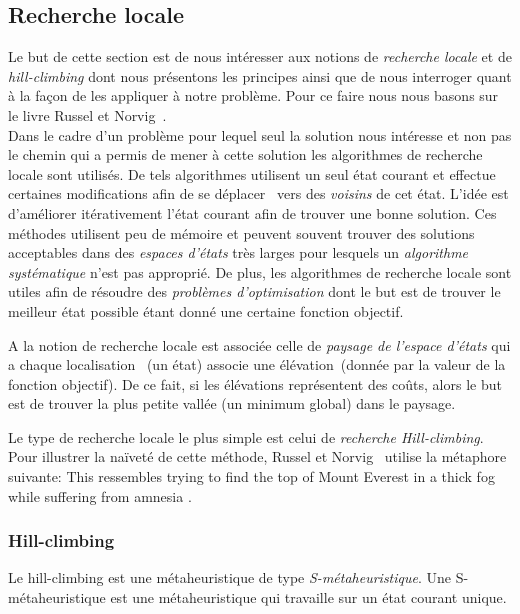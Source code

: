 
\subsection{Recherche locale}

Le but de cette section est de nous intéresser aux notions de \emph{recherche locale} et de \emph{hill-climbing} dont nous présentons les principes ainsi que de nous interroger quant à la façon de les appliquer à notre problème. Pour ce faire nous nous basons sur le livre Russel et Norvig~\cite{artInt}.\\

Dans le cadre d'un problème pour lequel seul la solution nous intéresse et non pas le chemin qui a permis de mener à cette solution les algorithmes de recherche locale sont utilisés. De tels algorithmes utilisent un seul état courant et effectue certaines modifications afin de \og se déplacer \fg~vers des \emph{voisins} de cet état. L'idée est d'améliorer itérativement l'état courant afin de trouver une bonne solution. Ces méthodes utilisent peu de mémoire et peuvent souvent trouver des solutions acceptables dans des \emph{espaces d'états} très larges pour lesquels un \emph{algorithme systématique} n'est pas approprié. De plus, les algorithmes de recherche locale sont utiles afin de résoudre des \emph{problèmes d'optimisation} dont le but est de trouver le meilleur état possible étant donné une certaine fonction objectif.

A la notion de recherche locale est associée celle de \emph{paysage de l'espace d'états} qui a chaque \og localisation \fg~(un état) associe une \og élévation\fg~(donnée par la valeur de la fonction objectif). De ce fait, si les élévations représentent des coûts, alors le but est de trouver la plus petite vallée (un minimum global) dans le paysage.

Le type de recherche locale le plus simple est celui de \emph{recherche Hill-climbing}. Pour illustrer la naïveté de cette méthode, Russel et Norvig~\cite{artInt} utilise la métaphore suivante: \og This ressembles trying to find the top of Mount Everest in a thick fog while suffering from amnesia \fg.

\subsubsection{Hill-climbing}

Le hill-climbing est une métaheuristique de type \emph{S-métaheuristique}. Une S-métaheuristique est une métaheuristique qui travaille sur un état courant unique. 


